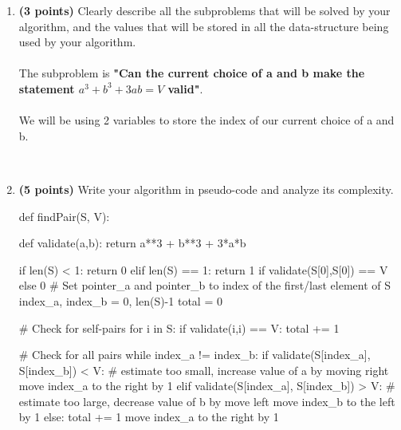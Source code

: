 \documentclass{assignment-373}
\begin{document}
\begin{enumerate}
\item \textbf{(3 points)} Clearly describe all the subproblems that
  will be solved by your algorithm, and the values that will be stored
  in all the data-structure being used by your algorithm.\\
  \textrm{\\
  \phantom{=} \phantom{=} The subproblem is {\bf "Can the current choice of a and b make the statement $a^3+b^3+3ab=V$ valid"}.\\
  \\
  \phantom{=} \phantom{=} We will be using 2 variables to store the index of our current choice of a and b.\\
  }
    
  \\
\item \textbf{(5 points)} Write your algorithm in pseudo-code and
  analyze its complexity.\\
  \begin{python}
def findPair(S, V):

    def validate(a,b):
        return a**3 + b**3 + 3*a*b

    if len(S) < 1:
        return 0
    elif len(S) == 1:
        return 1 if validate(S[0],S[0]) == V else 0
    # Set pointer_a and pointer_b to index of the first/last element of S
    index_a, index_b = 0, len(S)-1
    total = 0
    
    # Check for self-pairs
    for i in S:
        if validate(i,i) == V:
            total += 1
    
    # Check for all pairs
    while index_a != index_b:
        if validate(S[index_a], S[index_b]) < V:
            # estimate too small, increase value of a by moving right
            move index_a to the right by 1
        elif validate(S[index_a], S[index_b]) > V:
            # estimate too large, decrease value of b by move left
            move index_b to the left by 1
        else:
            total += 1
            move index_a to the right by 1
    

\end{python}
\end{enumerate}
\end{document}
